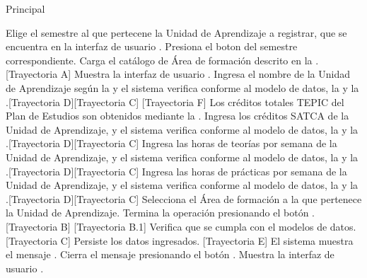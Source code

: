 \begin{UCtrayectoria}{Principal}

    \UCpaso[\UCactor] Elige el semestre al que pertecene la Unidad de Aprendizaje a registrar, que se encuentra en la interfaz de usuario .
    \UCpaso[\UCactor] Presiona el boton \IUbutton{+} del semestre correspondiente.
    \UCpaso Carga el catálogo de Área de formación descrito en la .[Trayectoria A]
    \UCpaso Muestra la interfaz de usuario .
    \UCpaso[\UCactor] Ingresa el nombre de la Unidad de Aprendizaje según la  y el sistema verifica conforme al modelo de datos, la  y la .[Trayectoria D][Trayectoria C] [Trayectoria F]
    \UCpaso Los créditos totales TEPIC del Plan de Estudios son obtenidos mediante la .
    \UCpaso[\UCactor] Ingresa los créditos SATCA de la Unidad de Aprendizaje, y el sistema verifica conforme al modelo de datos, la  y la .[Trayectoria D][Trayectoria C]
    \UCpaso[\UCactor] Ingresa las horas de teorías por semana de la Unidad de Aprendizaje, y el sistema verifica conforme al modelo de datos, la  y la .[Trayectoria D][Trayectoria C]
    \UCpaso[\UCactor] Ingresa las horas de prácticas por semana de la Unidad de Aprendizaje, y el sistema verifica conforme al modelo de datos, la  y la .[Trayectoria D][Trayectoria C]
    \UCpaso[\UCactor] Selecciona el Área de formación a la que pertenece la Unidad de Aprendizaje.
    \UCpaso[\UCactor] Termina la operación presionando el botón . [Trayectoria B] [Trayectoria B.1]
    \UCpaso Verifica que se cumpla con el modelos de datos. [Trayectoria C]
    \UCpaso Persiste los datos ingresados. [Trayectoria E]
    \UCpaso El sistema muestra el mensaje .
    \UCpaso[\UCactor] Cierra el mensaje presionando el botón .
    \UCpaso Muestra la interfaz de usuario  .
\end{UCtrayectoria}


